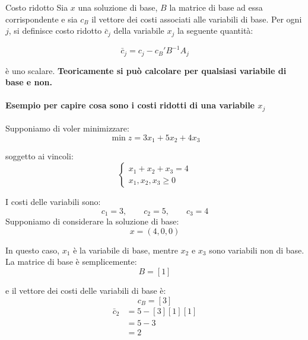 \begin{definition}{Costo ridotto}
Sia $x$ una soluzione di base, $B$ la matrice di base ad essa corrispondente e sia $c_B$ il vettore dei costi associati alle variabili di base. Per ogni $j$, si definisce costo ridotto $\bar{c}_j$ della variabile $x_j$ la seguente quantità:


$$\bar{c}_j = c_j - c_B' B^{-1} A_j$$


è uno scalare.
\textbf{Teoricamente si può calcolare per qualsiasi variabile di base e non.}
\end{definition}
\paragraph{Esempio per capire cosa sono i costi ridotti di una variabile $x_j$}
Supponiamo di voler minimizzare:
\[
\min z=3x_1+5x_2+4x_3
\]

soggetto ai vincoli:
\[
\begin{cases}
x_1+x_2+x_3=4\\
x_1,x_2,x_3\geq 0
\end{cases}
\]

I costi delle variabili sono:
\[
c_1=3,\qquad c_2=5,\qquad c_3=4
\]
Supponiamo di considerare la soluzione di base:
\[
x=(4,0,0)
\]

In questo caso, \(x_1\) è la variabile di base, mentre \(x_2\) e \(x_3\) sono variabili non di base.
La matrice di base è semplicemente:
\[
B=[1]
\]

e il vettore dei costi delle variabili di base è:
\[
c_B=[3]
\]
\[
\begin{aligned}
\bar c_2
&=5-[3][1][1]\\
&=5-3\\
&=\boxed{2}
\end{aligned}
\]

